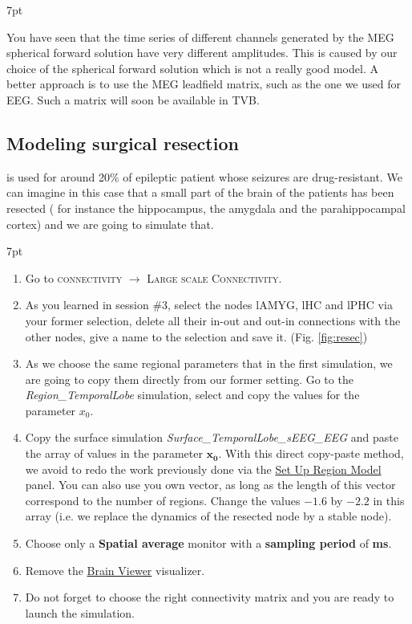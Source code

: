 \documentclass{tufte-handout}
\newenvironment{simulation}{%
  \def\FrameCommand{%
    \hspace{1pt}%
    {\color{ForestGreen}\vrule width 2pt}%
    {\color{simulationshade}\vrule width 4pt}%
    \colorbox{simulationshade}%
  }%
  \MakeFramed{\advance\hsize-\width\FrameRestore}%
  \noindent\hspace{-4.55pt}%
  \begin{adjustwidth}{}{7pt}%
  \vspace{2pt}\vspace{2pt}%
}
{%
  \vspace{2pt}\end{adjustwidth}\endMakeFramed%
}
\newenvironment{blah}{%
  \def\FrameCommand{%
    \hspace{1pt}%
    {\color{DarkOrange}\vrule width 2pt}%
    {\color{PeachPuff}\vrule width 4pt}%
    \colorbox{PeachPuff}%
  }%
  \MakeFramed{\advance\hsize-\width\FrameRestore}%
  \noindent\hspace{-4.55pt}%
  \begin{adjustwidth}{}{7pt}%
  \vspace{2pt}\vspace{2pt}%
}
{%
  \vspace{2pt}\end{adjustwidth}\endMakeFramed%
}
\begin{document}
\begin{blah}
You have seen that the time series of different channels generated by the MEG spherical forward solution have very different amplitudes. This is caused
by our choice of the spherical forward solution which is not a really good model. A better approach is to use the MEG leadfield matrix, such as the one we used for EEG. Such a matrix will soon be available in TVB.
\end{blah}

\subsection{Modeling surgical resection}

 is used for around 20\% of epileptic patient whose seizures are drug-resistant. We can imagine in this case that a small part of the brain of the patients 
has been resected ( for instance the hippocampus, the amygdala and the parahippocampal cortex) and 
we are going to simulate that.

\begin{simulation}
  \begin{enumerate}
  \item Go to \textsc{connectivity} $\rightarrow$ \textsc{Large scale Connectivity}.
  \item As you learned in session \#3, select the nodes lAMYG, lHC and lPHC via your former selection, delete all their in-out and out-in connections
  with the other nodes, give a name to the selection and save it. (Fig. \ref{fig:resec})
  \item As we choose the same regional parameters that in the first simulation, we are going to copy them directly from our
  former setting. Go to the \textit{Region\_TemporalLobe} simulation, select and copy the values for the parameter  $x_0$. 
  \item Copy the surface simulation \textit{Surface\_TemporalLobe\_sEEG\_EEG} and paste the array of values in the parameter $\mathbf{x_0}$.
  With this direct copy-paste method, we avoid to redo the work previously done via the \underline{Set Up Region Model} panel.
  You can also use you own vector, as long as the length of this vector correspond to the number of regions.
  Change the values $\mathbf{-1.6}$ by $\mathbf{-2.2}$ in this array (i.e. we replace the dynamics of the resected node by a stable node).
  \item Choose only a \textbf{Spatial average} monitor with a \textbf{sampling period} of \textbf{\unit[1]{ms}}.
  \item Remove the \underline{Brain Viewer} visualizer.
  \item Do not forget to choose the right connectivity matrix and you are ready to launch the simulation.
  \end{enumerate}
\end{simulation}
\end{document}
